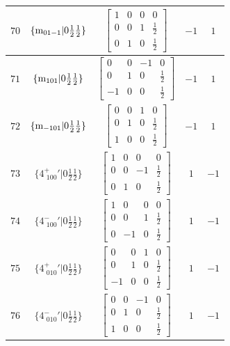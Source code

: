 \documentclass[fleqn,8pt]{jsarticle}
\begin{document}
\begin{longtable}{ccccc}
$ 70 $ & $ \{{\rm m}_{01-1}|0 \frac{1}{2} \frac{1}{2}\} $ & $ \begin{bmatrix} 1 & 0 & 0 & 0 \\ 0 & 0 & 1 & \frac{1}{2} \\ 0 & 1 & 0 & \frac{1}{2} \end{bmatrix} $ & $ -1 $ & $ 1 $ \\ \hline
$ 71 $ & $ \{{\rm m}_{101}|0 \frac{1}{2} \frac{1}{2}\} $ & $ \begin{bmatrix} 0 & 0 & -1 & 0 \\ 0 & 1 & 0 & \frac{1}{2} \\ -1 & 0 & 0 & \frac{1}{2} \end{bmatrix} $ & $ -1 $ & $ 1 $ \\ \hline
$ 72 $ & $ \{{\rm m}_{-101}|0 \frac{1}{2} \frac{1}{2}\} $ & $ \begin{bmatrix} 0 & 0 & 1 & 0 \\ 0 & 1 & 0 & \frac{1}{2} \\ 1 & 0 & 0 & \frac{1}{2} \end{bmatrix} $ & $ -1 $ & $ 1 $ \\ \hline
$ 73 $ & $ \{4^{+}_{\,\,100}{}'|0 \frac{1}{2} \frac{1}{2}\} $ & $ \begin{bmatrix} 1 & 0 & 0 & 0 \\ 0 & 0 & -1 & \frac{1}{2} \\ 0 & 1 & 0 & \frac{1}{2} \end{bmatrix} $ & $ 1 $ & $ -1 $ \\ \hline
$ 74 $ & $ \{4^{-}_{\,\,100}{}'|0 \frac{1}{2} \frac{1}{2}\} $ & $ \begin{bmatrix} 1 & 0 & 0 & 0 \\ 0 & 0 & 1 & \frac{1}{2} \\ 0 & -1 & 0 & \frac{1}{2} \end{bmatrix} $ & $ 1 $ & $ -1 $ \\ \hline
$ 75 $ & $ \{4^{+}_{\,\,010}{}'|0 \frac{1}{2} \frac{1}{2}\} $ & $ \begin{bmatrix} 0 & 0 & 1 & 0 \\ 0 & 1 & 0 & \frac{1}{2} \\ -1 & 0 & 0 & \frac{1}{2} \end{bmatrix} $ & $ 1 $ & $ -1 $ \\ \hline
$ 76 $ & $ \{4^{-}_{\,\,010}{}'|0 \frac{1}{2} \frac{1}{2}\} $ & $ \begin{bmatrix} 0 & 0 & -1 & 0 \\ 0 & 1 & 0 & \frac{1}{2} \\ 1 & 0 & 0 & \frac{1}{2} \end{bmatrix} $ & $ 1 $ & $ -1 $ \\ \hline

\end{longtable}
\end{document}
